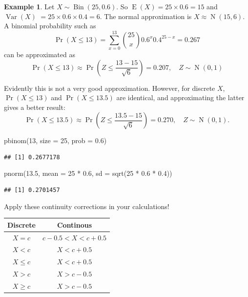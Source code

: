 \documentclass[
]{book}
\newenvironment{Shaded}{\begin{snugshade}}{\end{snugshade}}
\newcommand{\AttributeTok}[1]{\textcolor[rgb]{0.77,0.63,0.00}{#1}}
\newcommand{\DecValTok}[1]{\textcolor[rgb]{0.00,0.00,0.81}{#1}}
\newcommand{\FloatTok}[1]{\textcolor[rgb]{0.00,0.00,0.81}{#1}}
\newcommand{\FunctionTok}[1]{\textcolor[rgb]{0.00,0.00,0.00}{#1}}
\newcommand{\NormalTok}[1]{#1}
\newcommand{\SpecialCharTok}[1]{\textcolor[rgb]{0.00,0.00,0.00}{#1}}
\DeclareMathOperator{\E}{E}
\DeclareMathOperator{\Var}{Var}
\DeclareMathOperator{\N}{N}
\DeclareMathOperator{\Bin}{Bin}
\theoremstyle{definition}
\theoremstyle{definition}
\newtheorem{example}{Example}[chapter]
\theoremstyle{definition}
\theoremstyle{definition}
\theoremstyle{remark}
\begin{document}
\begin{example}
Let \(X\sim\Bin(25, 0.6)\). So \(\E(X)=25\times 0.6=15\) and \(\Var(X)\) \(=25\times0.6\times 0.4=6\). The normal approximation is \(X \approx \N(15, 6)\).
A binomial probability such as
\[
\Pr(X\leq 13)=\sum_{x=0}^{13} {25 \choose x} 0.6^x0.4^{25-x}=0.267
\]
can be approximated as
\[
\Pr(X\leq 13)\approx \Pr\left(Z \leq \frac{13-15}{\sqrt 6}\right)=0.207, \hspace{1em} Z\sim\N(0,1)
\]

Evidently this is not a very good approximation. However, for discrete \(X\), \(\Pr(X\leq 13)\) and \(\Pr(X\leq 13.5)\) are identical, and approximating the latter gives a better result:
\[
\Pr(X\leq 13.5)\approx \Pr\left(Z \leq \frac{13.5-15}{\sqrt 6}\right)=0.270, \hspace{1em} Z\sim\N(0,1).
\]
\end{example}

\begin{Shaded}
\begin{Highlighting}[]
\FunctionTok{pbinom}\NormalTok{(}\DecValTok{13}\NormalTok{, }\AttributeTok{size =} \DecValTok{25}\NormalTok{, }\AttributeTok{prob =} \FloatTok{0.6}\NormalTok{)}
\end{Highlighting}
\end{Shaded}

\begin{verbatim}
## [1] 0.2677178
\end{verbatim}

\begin{Shaded}
\begin{Highlighting}[]
\FunctionTok{pnorm}\NormalTok{(}\FloatTok{13.5}\NormalTok{, }\AttributeTok{mean =} \DecValTok{25} \SpecialCharTok{*} \FloatTok{0.6}\NormalTok{, }\AttributeTok{sd =} \FunctionTok{sqrt}\NormalTok{(}\DecValTok{25} \SpecialCharTok{*} \FloatTok{0.6} \SpecialCharTok{*} \FloatTok{0.4}\NormalTok{))}
\end{Highlighting}
\end{Shaded}

\begin{verbatim}
## [1] 0.2701457
\end{verbatim}

Apply these continuity corrections in your calculations!

\begin{longtable}[]{@{}cc@{}}
\toprule
Discrete & Continous \\
\midrule
\endhead
\(X=c\) & \(c-0.5 < X < c + 0.5\) \\
\(X<c\) & \(X < c + 0.5\) \\
\(X\leq c\) & \(X < c + 0.5\) \\
\(X>c\) & \(X>c-0.5\) \\
\(X\geq c\) & \(X>c-0.5\) \\
\bottomrule
\end{longtable}
\end{document}
